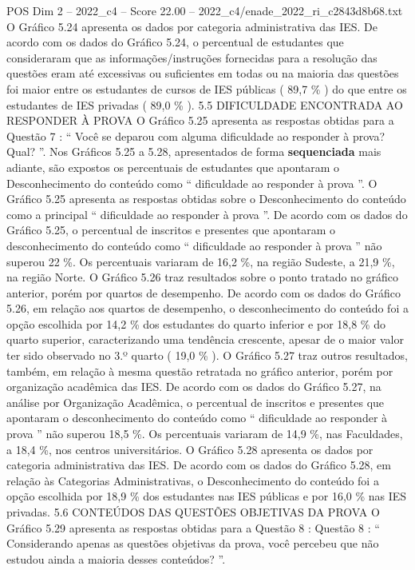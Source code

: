 \begin{textsample}{POS Dim 2 – 2022\_c4 – Score 22.00 – 2022\_c4/enade\_2022\_ri\_c2843d8b68.txt}
O Gráfico 5.24 apresenta os dados por categoria administrativa das IES.
De acordo com os dados do Gráfico 5.24, o percentual de estudantes que consideraram que as informações/instruções fornecidas para a resolução das questões eram até excessivas ou suficientes em todas ou na maioria das questões foi maior entre os estudantes de cursos de IES públicas ( 89,7 \% ) do que entre os estudantes de IES privadas ( 89,0 \% ). 5.5 DIFICULDADE ENCONTRADA AO RESPONDER À PROVA O Gráfico 5.25 apresenta as respostas obtidas para a Questão 7 : “ Você se deparou com alguma dificuldade ao responder à prova?
Qual? ”.
Nos Gráficos 5.25 a 5.28, apresentados de forma \textbf{sequenciada} mais adiante, são expostos os percentuais de estudantes que apontaram o Desconhecimento do conteúdo como “ dificuldade ao responder à prova ”.
O Gráfico 5.25 apresenta as respostas obtidas sobre o Desconhecimento do conteúdo como a principal “ dificuldade ao responder à prova ”.
De acordo com os dados do Gráfico 5.25, o percentual de inscritos e presentes que apontaram o desconhecimento do conteúdo como “ dificuldade ao responder à prova ” não superou 22 \%.
Os percentuais variaram de 16,2 \%, na região Sudeste, a 21,9 \%, na região Norte.
O Gráfico 5.26 traz resultados sobre o ponto tratado no gráfico anterior, porém por quartos de desempenho.
De acordo com os dados do Gráfico 5.26, em relação aos quartos de desempenho, o desconhecimento do conteúdo foi a opção escolhida por 14,2 \% dos estudantes do quarto inferior e por 18,8 \% do quarto superior, caracterizando uma tendência crescente, apesar de o maior valor ter sido observado no 3.º quarto ( 19,0 \% ).
O Gráfico 5.27 traz outros resultados, também, em relação à mesma questão retratada no gráfico anterior, porém por organização acadêmica das IES.
De acordo com os dados do Gráfico 5.27, na análise por Organização Acadêmica, o percentual de inscritos e presentes que apontaram o desconhecimento do conteúdo como “ dificuldade ao responder à prova ” não superou 18,5 \%.
Os percentuais variaram de 14,9 \%, nas Faculdades, a 18,4 \%, nos centros universitários.
O Gráfico 5.28 apresenta os dados por categoria administrativa das IES.
De acordo com os dados do Gráfico 5.28, em relação às Categorias Administrativas, o Desconhecimento do conteúdo foi a opção escolhida por 18,9 \% dos estudantes nas IES públicas e por 16,0 \% nas IES privadas. 5.6 CONTEÚDOS DAS QUESTÕES OBJETIVAS DA PROVA O Gráfico 5.29 apresenta as respostas obtidas para a Questão 8 : Questão 8 : “ Considerando apenas as questões objetivas da prova, você percebeu que não estudou ainda a maioria desses conteúdos? ”.

\end{textsample}
